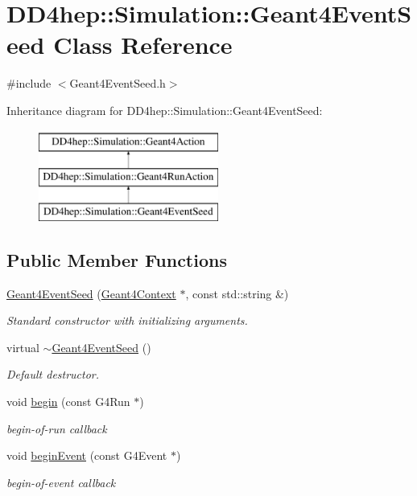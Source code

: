 \hypertarget{class_d_d4hep_1_1_simulation_1_1_geant4_event_seed}{}\section{D\+D4hep\+:\+:Simulation\+:\+:Geant4\+Event\+Seed Class Reference}
\label{class_d_d4hep_1_1_simulation_1_1_geant4_event_seed}


{\ttfamily \#include $<$Geant4\+Event\+Seed.\+h$>$}

Inheritance diagram for D\+D4hep\+:\+:Simulation\+:\+:Geant4\+Event\+Seed\+:\begin{figure}[H]
\begin{center}
\leavevmode
\includegraphics[height=3.000000cm]{class_d_d4hep_1_1_simulation_1_1_geant4_event_seed}
\end{center}
\end{figure}
\subsection*{Public Member Functions}
\begin{DoxyCompactItemize}
\item 
\hyperlink{class_d_d4hep_1_1_simulation_1_1_geant4_event_seed_af30e767cc26c46b017fa8ce36fc8c906}{Geant4\+Event\+Seed} (\hyperlink{class_d_d4hep_1_1_simulation_1_1_geant4_context}{Geant4\+Context} $\ast$, const std\+::string \&)
\begin{DoxyCompactList}\small\item\em Standard constructor with initializing arguments. \end{DoxyCompactList}\item 
virtual \hyperlink{class_d_d4hep_1_1_simulation_1_1_geant4_event_seed_aa5a136f12e95432a45ca2eef0c1b6856}{$\sim$\+Geant4\+Event\+Seed} ()
\begin{DoxyCompactList}\small\item\em Default destructor. \end{DoxyCompactList}\item 
void \hyperlink{class_d_d4hep_1_1_simulation_1_1_geant4_event_seed_a297ed6d4c7366df16c151f31bee46028}{begin} (const G4\+Run $\ast$)
\begin{DoxyCompactList}\small\item\em begin-\/of-\/run callback \end{DoxyCompactList}\item 
void \hyperlink{class_d_d4hep_1_1_simulation_1_1_geant4_event_seed_a3443a6ff92629d27474a97c1084d2867}{begin\+Event} (const G4\+Event $\ast$)
\begin{DoxyCompactList}\small\item\em begin-\/of-\/event callback \end{DoxyCompactList}\end{DoxyCompactItemize}
